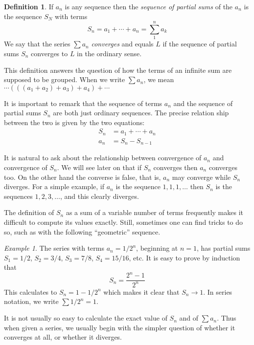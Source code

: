 \documentclass[11pt,oneside]{amsbook}
\theoremstyle{definition}
\theoremstyle{plain}
\theoremstyle{definition}
\newtheorem{defn}[thm]{Definition}
\theoremstyle{remark}
\newtheorem{example}[thm]{Example}
\numberwithin{equation}{section}
\numberwithin{figure}{section}
\begin{document}
\begin{defn}
  If $a_n$ is any sequence then the \emph{sequence of partial sums} of the $a_n$ is the sequence $S_N$ with terms
  \[S_n=a_1+\cdots+a_n=\sum_1^na_k
  \]
  We say that the series $\sum a_n$ \emph{converges} and equals $L$ if the sequence of partial sums $S_n$ converges to $L$ in the ordinary sense.
\end{defn}

This definition answers the question of how the terms of an infinite sum are supposed to be grouped. When we write $\sum a_n$, we mean $\cdots(((a_1+a_2)+a_3)+a_4)+\cdots$

It is important to remark that the sequence of terms $a_n$ and the sequence of partial sums $S_n$ are both just ordinary sequences. The precise relation ship between the two is given by the two equations:
\begin{align*}
  S_n&=a_1+\cdots+a_n\\
  a_n&=S_n-S_{n-1}
\end{align*}

It is natural to ask about the relationship between convergence of $a_n$ and convergence of $S_n$. We will see later on that if $S_n$ converges then $a_n$ converges too. On the other hand the converse is false, that is, $a_n$ may converge while $S_n$ diverges. For a simple example, if $a_n$ is the sequence $1,1,1,\ldots$ then $S_n$ is the sequences $1,2,3,\ldots$, and this clearly diverges.

The definition of $S_n$ as a sum of a variable number of terms frequently makes it difficult to compute its values exactly. Still, sometimes one can find tricks to do so, such as with the following ``geometric'' sequence.

\begin{example}
  \label{ex:geometric}
  The series with terms $a_n=1/2^n$, beginning at $n=1$, has partial sums $S_1=1/2$, $S_2=3/4$, $S_3=7/8$, $S_4=15/16$, etc. It is easy to prove by induction that
  \[S_n=\frac{2^n-1}{2^n}
  \]
  This calculates to $S_n=1-1/2^n$ which makes it clear that $S_n\to1$. In series notation, we write $\sum1/2^n=1$.
\end{example}

It is not usually so easy to calculate the exact value of $S_n$ and of $\sum a_n$. Thus when given a series, we usually begin with the simpler question of whether it converges at all, or whether it diverges.
\end{document}
